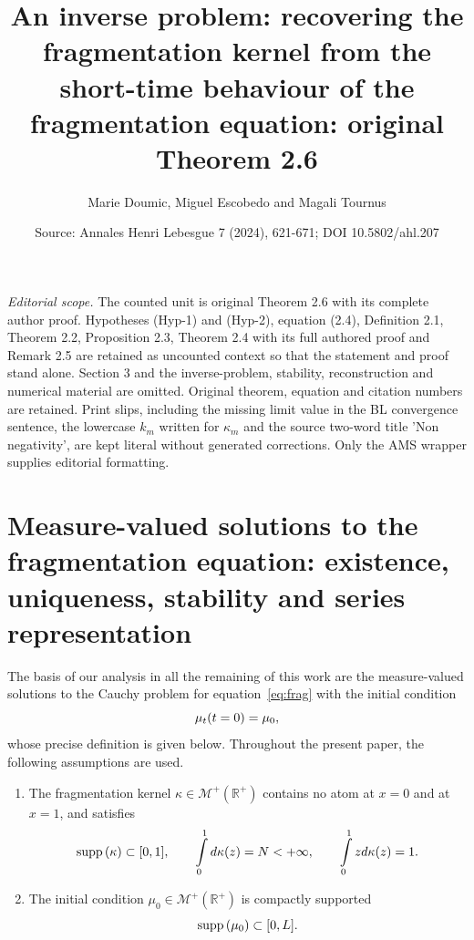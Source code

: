 \documentclass[10pt,a4paper]{amsart}
\title[Nonnegativity of the fragmentation power-series solution]{An inverse problem: recovering the fragmentation kernel from the short-time behaviour of the fragmentation equation: original Theorem 2.6}
\author{Marie Doumic, Miguel Escobedo and Magali Tournus}
\date{Source: Annales Henri Lebesgue 7 (2024), 621-671; DOI 10.5802/ahl.207}
\numberwithin{equation}{section}
\newcommand*\R{\mathbb{R}}
\newcommand*\M{\mathcal{M}}
\newcommand{\MT}[1]{{\textcolor{black}{#1}}}
\newcommand*\supp{{\mbox{\small\rm supp}}\,}
\newcommand*{\Hypenumi}{\renewcommand*{\theenumi}{\textbf{Hyp-\arabic{enumi}}}}
\begin{document}
\maketitle
\noindent\textit{Editorial scope.} The counted unit is original Theorem 2.6 with its complete author proof. Hypotheses (Hyp-1) and (Hyp-2), equation (2.4), Definition 2.1, Theorem 2.2, Proposition 2.3, Theorem 2.4 with its full authored proof and Remark 2.5 are retained as uncounted context so that the statement and proof stand alone. Section 3 and the inverse-problem, stability, reconstruction and numerical material are omitted. Original theorem, equation and citation numbers are retained. Print slips, including the missing limit value in the BL convergence sentence, the lowercase $k_m$ written for $\kappa_m$ and the source two-word title 'Non negativity', are kept literal without generated corrections. Only the AMS wrapper supplies editorial formatting.
\setcounter{section}{1}
\section{Measure-valued solutions to the fragmentation equation: existence, uniqueness, stability and series representation}
\label{Section20}

The basis of our analysis in all the remaining of this work are the measure-valued solutions to the Cauchy problem for equation~\ref{eq:frag} with the initial condition
\begin{equation}\label{eq:data}
\mu _t(\MT{t=0})=\mu _0,
\end{equation}
whose precise definition is given below. Throughout the present paper, the following assumptions are used.
\begin{enumerate}\Hypenumi
\item \label{hyp1}
The fragmentation kernel $\kappa \in \M^+(\R^+)$ contains no atom at $x=0$ and at $x=1$, and satisfies
\begin{equation}
\supp(\kappa)\subset [0,1], \qquad \int\limits_0^1d\kappa(z) =N<+\infty, \qquad \int\limits_0^1 z d\kappa(z)=1.
\end{equation}
\item \label{hyp2}
The initial condition $\mu_0 \in \M^+(\R^+)$ is compactly supported
\begin{equation}
\supp(\mu_0)\subset [0,\MT{L}].
\end{equation}
\end{enumerate}
\end{document}
